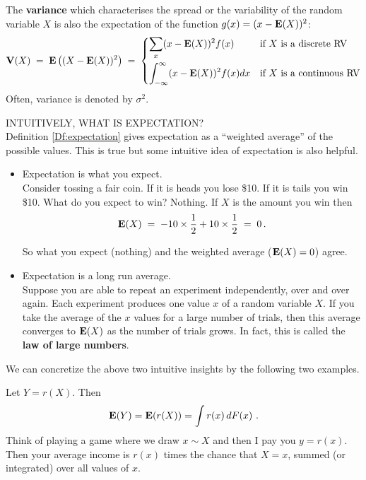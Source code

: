 The \textbf{variance} which characterises the spread or the
  variability of the random variable $X$ is also the expectation of the
  function $g(x)=(x-\mathbf{E}(X))^2$:
\[
\mathbf{V}(X)\; =\; \mathbf{E} \left( (X-\mathbf{E}(X))^2 \right)\; =\;
\begin{cases}
\displaystyle\sum_x (x-\mathbf{E}(X))^2 f(x) & \text{if $X$ is a discrete RV}\\[12pt]
\displaystyle\int_{-\infty}^{\infty} (x-\mathbf{E}(X))^2 f(x) dx & \text{if $X$ is a continuous RV}
\end{cases}
\] 
Often, variance is denoted by $\sigma^2$. 

INTUITIVELY, WHAT IS EXPECTATION?\\

Definition \ref{Df:expectation} gives expectation as a ``weighted average'' of the possible values. This is true but some intuitive idea of expectation is also helpful.
\begin{itemize}
\item Expectation is what you expect. \\[6pt]
Consider tossing a fair coin. If it is heads you lose \$10. If it is tails you win \$10. 
What do you expect to win? Nothing. 
If $X$ is the amount you win then $$\mathbf{E}(X)\;=\;-10\times \frac{1}{2}+10\times \frac{1}{2}\;=\;0\,.$$

So what you expect (nothing) and the weighted average ($\mathbf{E}(X)=0$) agree.


\item Expectation is a long run average.\\[6pt]
Suppose you are able to repeat an experiment independently, over and over again. 
Each experiment produces one value $x$ of a random variable $X$.  
If you take the average of the $x$ values for a large number of trials, then this average converges to $\mathbf{E}(X)$ as the number of trials grows.  In fact, this is called the {\bf law of large numbers}.
\end{itemize}

We can concretize the above two intuitive insights by the following two examples.

\begin{example}\label{EgWinningsOnAverage}
Let $Y = r(X)$.  Then
\[
\mathbf{E}(Y) = \mathbf{E}(r(X)) = \int r(x)\, d F(x) \ .
\]
Think of playing a game where we draw $x \sim X$ and then I pay you $y=r(x)$.  Then your average income is $r(x)$ times the chance that $X=x$, summed (or integrated) over all values of $x$.
\end{example}

